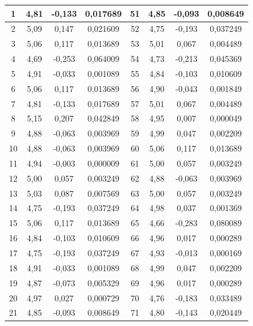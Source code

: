 \documentclass[a4paper,12pt]{article}
\begin{document}
\begin{longtable}{|c|c|c|c|c|c|c|c|}
    1  & 4{,}81 & -0{,}133 & 0{,}017689 & 51  & 4{,}85 & -0{,}093 & 0{,}008649 \\ \hline
    2  & 5{,}09 & 0{,}147  & 0{,}021609 & 52  & 4{,}75 & -0{,}193 & 0{,}037249 \\ \hline
    3  & 5{,}06 & 0{,}117  & 0{,}013689 & 53  & 5{,}01 & 0{,}067  & 0{,}004489 \\ \hline
    4  & 4{,}69 & -0{,}253 & 0{,}064009 & 54  & 4{,}73 & -0{,}213 & 0{,}045369 \\ \hline
    5  & 4{,}91 & -0{,}033 & 0{,}001089 & 55  & 4{,}84 & -0{,}103 & 0{,}010609 \\ \hline
    6  & 5{,}06 & 0{,}117  & 0{,}013689 & 56  & 4{,}90 & -0{,}043 & 0{,}001849 \\ \hline
    7  & 4{,}81 & -0{,}133 & 0{,}017689 & 57  & 5{,}01 & 0{,}067  & 0{,}004489 \\ \hline
    8  & 5{,}15 & 0{,}207  & 0{,}042849 & 58  & 4{,}95 & 0{,}007  & 0{,}000049 \\ \hline
    9  & 4{,}88 & -0{,}063 & 0{,}003969 & 59  & 4{,}99 & 0{,}047  & 0{,}002209 \\ \hline
    10 & 4{,}88 & -0{,}063 & 0{,}003969 & 60  & 5{,}06 & 0{,}117  & 0{,}013689 \\ \hline
    11 & 4{,}94 & -0{,}003 & 0{,}000009 & 61  & 5{,}00 & 0{,}057  & 0{,}003249 \\ \hline
    12 & 5{,}00 & 0{,}057  & 0{,}003249 & 62  & 4{,}88 & -0{,}063 & 0{,}003969 \\ \hline
    13 & 5{,}03 & 0{,}087  & 0{,}007569 & 63  & 5{,}00 & 0{,}057  & 0{,}003249 \\ \hline
    14 & 4{,}75 & -0{,}193 & 0{,}037249 & 64  & 4{,}98 & 0{,}037  & 0{,}001369 \\ \hline
    15 & 5{,}06 & 0{,}117  & 0{,}013689 & 65  & 4{,}66 & -0{,}283 & 0{,}080089 \\ \hline
    16 & 4{,}84 & -0{,}103 & 0{,}010609 & 66  & 4{,}96 & 0{,}017  & 0{,}000289 \\ \hline
    17 & 4{,}75 & -0{,}193 & 0{,}037249 & 67  & 4{,}93 & -0{,}013 & 0{,}000169 \\ \hline
    18 & 4{,}91 & -0{,}033 & 0{,}001089 & 68  & 4{,}99 & 0{,}047  & 0{,}002209 \\ \hline
    19 & 4{,}87 & -0{,}073 & 0{,}005329 & 69  & 4{,}96 & 0{,}017  & 0{,}000289 \\ \hline
    20 & 4{,}97 & 0{,}027  & 0{,}000729 & 70  & 4{,}76 & -0{,}183 & 0{,}033489 \\ \hline
    21 & 4{,}85 & -0{,}093 & 0{,}008649 & 71  & 4{,}80 & -0{,}143 & 0{,}020449 \\ \hline

\end{longtable}
\end{document}
